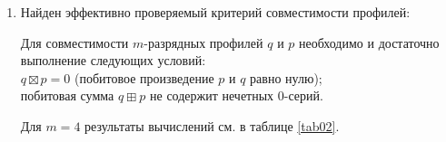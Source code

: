 %
\begin{enumerate}
	\item 
Найден эффективно проверяемый критерий совместимости профилей:

Для совместимости $m$-разрядных профилей $q$ и $p$ необходимо и достаточно выполнение следующих условий:\\
$q\boxtimes p=0$ (побитовое произведение $p$ и $q$ равно нулю); \\
побитовая сумма $q\boxplus p$ не содержит нечетных 0-серий.

Для $m=4$ результаты вычислений  см. в таблице \ref{tab02}.


\end{enumerate}
